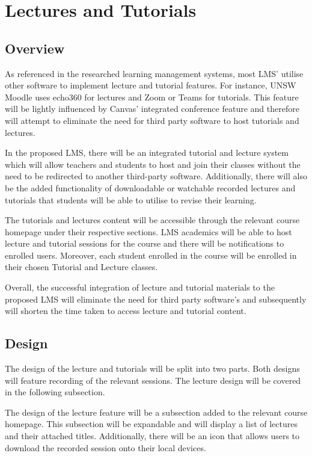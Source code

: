 \newpage
\section{Lectures and Tutorials}
\subsection{Overview}
As referenced in the researched learning management systems, most LMS’ utilise other software to implement lecture and tutorial features. For instance, UNSW Moodle uses 
echo360 for lectures and Zoom or Teams for tutorials. This feature will be lightly influenced by Canvas’ integrated conference feature and therefore will attempt to 
eliminate the need for third party software to host tutorials and lectures. 

In the proposed LMS, there will be an integrated tutorial and lecture system which will allow teachers and students to host and join their classes without the need to 
be redirected to another third-party software. Additionally, there will also be the added functionality of downloadable or watchable recorded lectures and tutorials  
that students will be able to utilise to revise their learning. 

The tutorials and lectures content will be accessible through the relevant course homepage under their respective sections. LMS academics will be able to host lecture 
and tutorial sessions for the course and there will be notifications to enrolled users. Moreover, each student enrolled in the course will be enrolled in their chosen 
Tutorial and Lecture classes. 

Overall, the successful integration of lecture and tutorial materials to the proposed LMS will eliminate the need for third party software’s and subsequently will shorten 
the time taken to access lecture and tutorial content.

\subsection{Design}
The design of the lecture and tutorials will be split into two parts. Both designs will feature recording of the relevant sessions. The lecture design will be 
covered in the following subsection. 

The design of the lecture feature will be a subsection added to the relevant course homepage. This subsection will be expandable and will display a list of lectures 
and their attached titles. Additionally, there will be an icon that allows users to download the recorded session onto their local devices.

